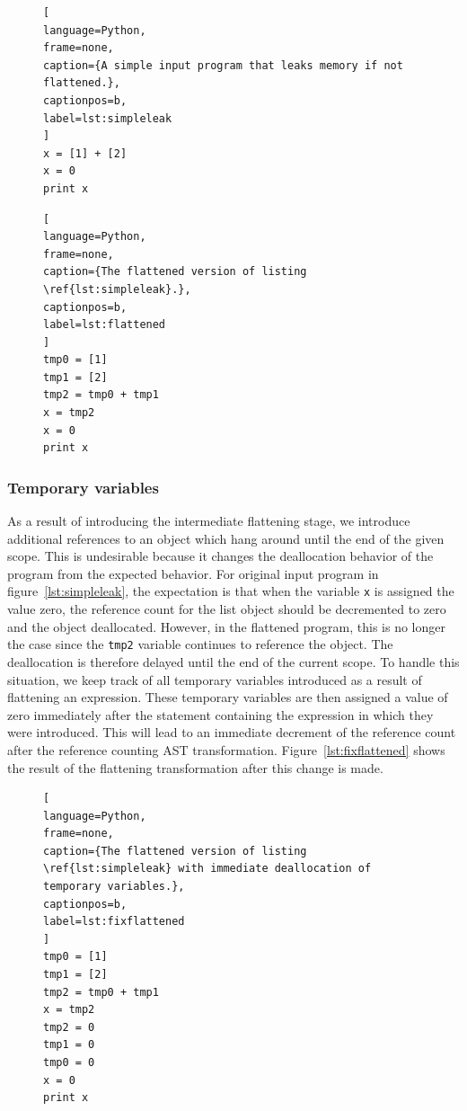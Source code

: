 \documentclass{sigplanconf}
\begin{document}
\begin{figure}[h!]
\begin{lstlisting}[
language=Python,
frame=none,
caption={A simple input program that leaks memory if not flattened.},
captionpos=b,
label=lst:simpleleak
]
x = [1] + [2]
x = 0
print x
\end{lstlisting}
\end{figure}

\begin{figure}[h!]
\begin{lstlisting}[
language=Python,
frame=none,
caption={The flattened version of listing \ref{lst:simpleleak}.},
captionpos=b,
label=lst:flattened
]
tmp0 = [1]
tmp1 = [2]
tmp2 = tmp0 + tmp1
x = tmp2
x = 0
print x
\end{lstlisting}
\end{figure}

\subsubsection{Temporary variables}
As a result of introducing the intermediate flattening stage, we introduce additional references to an object which hang around until the end of the given scope.  This is undesirable because it changes the deallocation behavior of the program from the expected behavior.  For original input program in figure~\ref{lst:simpleleak}, the expectation is that when the variable \texttt{x} is assigned the value zero, the reference count for the list object should be decremented to zero and the object deallocated.  However, in the flattened program, this is no longer the case since the \texttt{tmp2} variable continues to reference the object.  The deallocation is therefore delayed until the end of the current scope.  To handle this situation, we keep track of all temporary variables introduced as a result of flattening an expression.  These temporary variables are then assigned a value of zero immediately after the statement containing the expression in which they were introduced.  This will lead to an immediate decrement of the reference count after the reference counting AST transformation.  Figure~\ref{lst:fixflattened} shows the result of the flattening transformation after this change is made.

\begin{figure}[h!]
\begin{lstlisting}[
language=Python,
frame=none,
caption={The flattened version of listing \ref{lst:simpleleak} with immediate deallocation of temporary variables.},
captionpos=b,
label=lst:fixflattened
]
tmp0 = [1]
tmp1 = [2]
tmp2 = tmp0 + tmp1
x = tmp2
tmp2 = 0
tmp1 = 0
tmp0 = 0
x = 0
print x
\end{lstlisting}
\end{figure}
\end{document}
